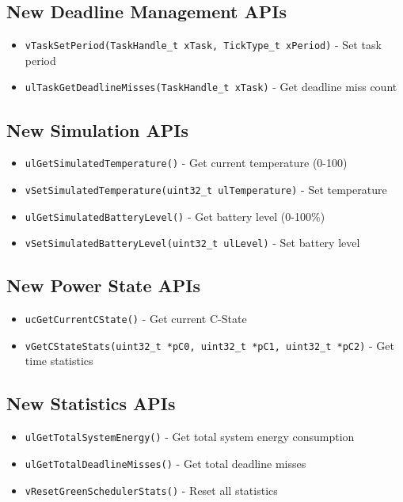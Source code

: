 \documentclass[11pt,a4paper]{article}
\begin{document}
\subsection{New Deadline Management APIs}
\begin{itemize}
    \item \texttt{vTaskSetPeriod(TaskHandle\_t xTask, TickType\_t xPeriod)} - Set task period
    \item \texttt{ulTaskGetDeadlineMisses(TaskHandle\_t xTask)} - Get deadline miss count
\end{itemize}

\subsection{New Simulation APIs}
\begin{itemize}
    \item \texttt{ulGetSimulatedTemperature()} - Get current temperature (0-100)
    \item \texttt{vSetSimulatedTemperature(uint32\_t ulTemperature)} - Set temperature
    \item \texttt{ulGetSimulatedBatteryLevel()} - Get battery level (0-100\%)
    \item \texttt{vSetSimulatedBatteryLevel(uint32\_t ulLevel)} - Set battery level
\end{itemize}

\subsection{New Power State APIs}
\begin{itemize}
    \item \texttt{ucGetCurrentCState()} - Get current C-State
    \item \texttt{vGetCStateStats(uint32\_t *pC0, uint32\_t *pC1, uint32\_t *pC2)} - Get time statistics
\end{itemize}

\subsection{New Statistics APIs}
\begin{itemize}
    \item \texttt{ulGetTotalSystemEnergy()} - Get total system energy consumption
    \item \texttt{ulGetTotalDeadlineMisses()} - Get total deadline misses
    \item \texttt{vResetGreenSchedulerStats()} - Reset all statistics
\end{itemize}
\end{document}
